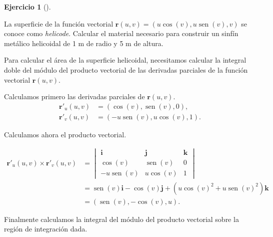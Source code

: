 \documentclass[
  spanish,
  a4paper,
]{scrreport}
\theoremstyle{definition}
\newtheorem{exercise}{Ejercicio}[chapter]
\theoremstyle{remark}
\begin{document}
\begin{exercise}[]\protect\hypertarget{exr-helicoide}{}\label{exr-helicoide}

La superficie de la función vectorial
\(\mathbf{r}(u,v)=(u\cos(v), u\operatorname{sen}(v), v)\) se conoce como
\emph{helicode}. Calcular el material necesario para construir un sinfín
metálico helicoidal de 1 m de radio y 5 m de altura.

\end{exercise}

\begin{tcolorbox}[enhanced jigsaw, arc=.35mm, bottomrule=.15mm, bottomtitle=1mm, breakable, colback=white, colbacktitle=quarto-callout-tip-color!10!white, colframe=quarto-callout-tip-color-frame, coltitle=black, left=2mm, leftrule=.75mm, opacityback=0, opacitybacktitle=0.6, rightrule=.15mm, title=\textcolor{quarto-callout-tip-color}{\faLightbulb}\hspace{0.5em}{Solución}, titlerule=0mm, toprule=.15mm, toptitle=1mm]

Para calcular el área de la superficie helicoidal, necesitamos calcular
la integral doble del módulo del producto vectorial de las derivadas
parciales de la función vectorial \(\mathbf{r}(u,v)\).

Calculamos primero las derivadas parciales de \(\mathbf{r}(u,v)\).
\begin{align*}
\mathbf{r}'_u(u,v) &= (\cos(v), \operatorname{sen}(v), 0), \\
\mathbf{r}'_v(u,v) &= (-u\operatorname{sen}(v), u\cos(v), 1).
\end{align*}

Calculamos ahora el producto vectorial.

\begin{align*}
\mathbf{r}'_u(u,v) \times \mathbf{r}'_v(u,v)
&= \begin{vmatrix}
\mathbf{i} & \mathbf{j} & \mathbf{k} \\
\cos(v) & \operatorname{sen}(v) & 0 \\
-u\operatorname{sen}(v) & u\cos(v) & 1
\end{vmatrix} \\
&= \operatorname{sen}(v) \mathbf{i} - \cos(v)\mathbf{j} + (u\cos(v)^2 + u\operatorname{sen}(v)^2) \mathbf{k}\\
&= (\operatorname{sen}(v), -\cos(v), u).
\end{align*}

Finalmente calculamos la integral del módulo del producto vectorial
sobre la región de integración dada.


\end{tcolorbox}
\end{document}
